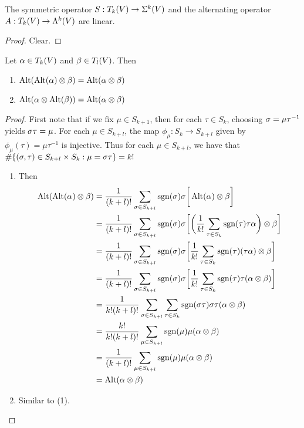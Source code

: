 \documentclass{book}
\begin{document}
	\begin{ex}
		The symmetric operator $S: T_k(V) \rightarrow \Sigma^k(V)$ and the alternating operator $A: T_k(V) \rightarrow \Lambda^k(V)$ are linear.
	\end{ex}

	\begin{proof}
		Clear.
	\end{proof}

	\begin{ex}
		Let $\alpha \in T_k(V)$ and $\beta \in T_l(V)$. Then 
		\begin{enumerate}
			\item $\operatorname{Alt}(\operatorname{Alt}(\alpha) \otimes \beta) = \operatorname{Alt}(\alpha \otimes \beta)$
			\item $\operatorname{Alt}(\alpha \otimes \operatorname{Alt}(\beta)) = \operatorname{Alt}(\alpha \otimes \beta)$
		\end{enumerate}
	\end{ex}
	
	\begin{proof}
		First note that if we fix $\mu \in S_{k+1}$, then for each $\tau \in S_k$, choosing $\sigma = \mu \tau^{-1}$ yields $\sigma \tau = \mu$. For each $\mu \in S_{k+l}$, the map $\phi_{\mu}: S_{k} \rightarrow S_{k+l}$ given by $\phi_{\mu}(\tau) = \mu \tau^{-1}$ is injective. Thus for each $\mu \in S_{k+l}$, we have that $\# \{ (\sigma, \tau) \in S_{k+l} \times S_{k}: \mu = \sigma \tau \} = k!$ 
		\begin{enumerate}
			\item Then
			\begin{align*}
				\operatorname{Alt}(\operatorname{Alt}(\alpha) \otimes \beta)
				&= \frac{1}{(k+l)!} \sum_{\sigma \in S_{k+l}} \operatorname{sgn}(\sigma) \sigma \bigg [\operatorname{Alt}(\alpha) \otimes \beta \bigg] \\
				&= \frac{1}{(k+l)!} \sum_{\sigma \in S_{k+l}} \operatorname{sgn}(\sigma) \sigma \bigg[ \bigg( \frac{1}{k!}\sum_{\tau \in S_{k} } \operatorname{sgn}(\tau) \tau\alpha \bigg) \otimes \beta \bigg] \\
				&= \frac{1}{(k+l)!} \sum_{\sigma \in S_{k+l}} \operatorname{sgn}(\sigma) \sigma \bigg[   \frac{1}{k!} \sum_{\tau \in S_{k} } \operatorname{sgn}(\tau) (\tau\alpha)  \otimes \beta \bigg] \\
				&= \frac{1}{(k+l)!} \sum_{\sigma \in S_{k+l}} \operatorname{sgn}(\sigma) \sigma \bigg[  \frac{1}{k!} \sum_{\tau \in S_{k} } \operatorname{sgn}(\tau) \tau (\alpha  \otimes \beta) \bigg] \\
				&=  \frac{1}{k! (k+l)!}\sum_{\sigma \in S_{k+l} } \sum_{\tau \in S_{k} } \operatorname{sgn}(\sigma \tau) \sigma \tau (\alpha  \otimes \beta) \\
				&=  \frac{k!}{k!(k+l)!} \sum_{\mu \in S_{k+l} }  \operatorname{sgn}(\mu) \mu (\alpha  \otimes \beta)\\
				&=  \frac{1}{(k+l)!} \sum_{\mu \in S_{k+l} }  \operatorname{sgn}(\mu) \mu (\alpha  \otimes \beta)\\
				&= \operatorname{Alt}(\alpha \otimes \beta)
			\end{align*} 
			\item Similar to (1).
		\end{enumerate}
	\end{proof}
	
\end{document}
